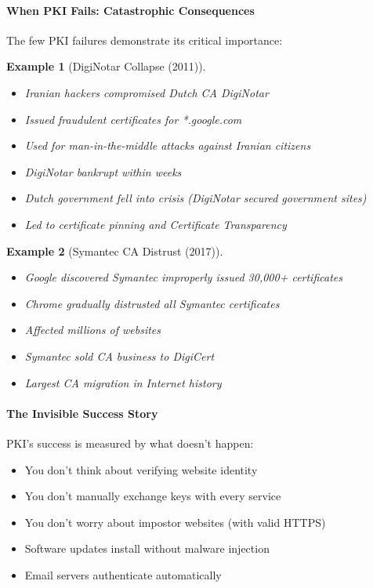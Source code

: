 \documentclass[11pt,a4paper]{article}
\newtheorem{example}{Example}
\begin{document}
\paragraph{When PKI Fails: Catastrophic Consequences}

The few PKI failures demonstrate its critical importance:

\begin{example}[DigiNotar Collapse (2011)]
\begin{itemize}
    \item Iranian hackers compromised Dutch CA DigiNotar
    \item Issued fraudulent certificates for *.google.com
    \item Used for man-in-the-middle attacks against Iranian citizens
    \item DigiNotar bankrupt within weeks
    \item Dutch government fell into crisis (DigiNotar secured government sites)
    \item Led to certificate pinning and Certificate Transparency
\end{itemize}
\end{example}

\begin{example}[Symantec CA Distrust (2017)]
\begin{itemize}
    \item Google discovered Symantec improperly issued 30,000+ certificates
    \item Chrome gradually distrusted all Symantec certificates
    \item Affected millions of websites
    \item Symantec sold CA business to DigiCert
    \item Largest CA migration in Internet history
\end{itemize}
\end{example}

\paragraph{The Invisible Success Story}

PKI's success is measured by what doesn't happen:
\begin{itemize}
    \item You don't think about verifying website identity
    \item You don't manually exchange keys with every service
    \item You don't worry about impostor websites (with valid HTTPS)
    \item Software updates install without malware injection
    \item Email servers authenticate automatically
\end{itemize}
\end{document}
